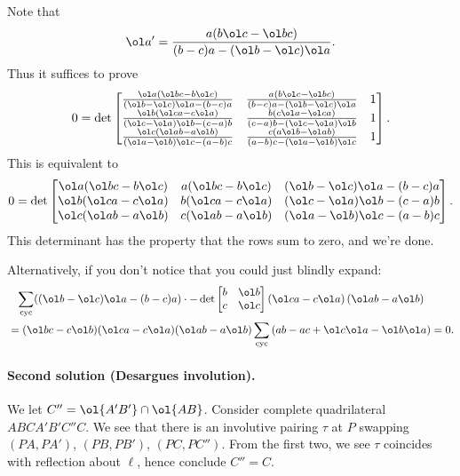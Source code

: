 \documentclass[11pt]{scrartcl}
\begin{document}
Note that
\[ \ol a' = \frac{a (b \ol c - \ol b c)}{(b-c) a - (\ol b - \ol c)\ol a}. \]
Thus it suffices to prove
\[ 0 = \det
\begin{bmatrix}
  \frac{\ol a(\ol b c-b \ol c)}{(\ol b - \ol c)\ol a - (b-c) a} & \frac{a (b \ol c - \ol b c)}{(b-c) a - (\ol b - \ol c) \ol a} & 1 \\
  \frac{\ol b(\ol c a-c \ol a)}{(\ol c - \ol a)\ol b - (c-a) b} & \frac{b (c \ol a - \ol c a)}{(c-a) b - (\ol c - \ol a) \ol b} & 1 \\
  \frac{\ol c(\ol a b-a \ol b)}{(\ol a - \ol b)\ol c - (a-b) c} & \frac{c (a \ol b - \ol a b)}{(a-b) c - (\ol a - \ol b)\ol c} & 1
\end{bmatrix}.
\]
This is equivalent to
\[ 0 = \det
\begin{bmatrix}
  \ol a(\ol b c -b \ol c) & a (\ol b c - b \ol c) & (\ol b - \ol c) \ol a - (b-c) a \\
  \ol b(\ol c a -c \ol a) & b (\ol c a - c \ol a) & (\ol c - \ol a) \ol b - (c-a) b \\
  \ol c(\ol a b -a \ol b) & c (\ol a b - a \ol b) & (\ol a - \ol b) \ol c - (a-b) c \\
\end{bmatrix}. \]
This determinant has the property that the rows sum to zero, and we're done.
\begin{remark*}
  Alternatively, if you don't notice that you could just blindly expand:
  \begin{align*}
    &\phantom{=} \sum_{\text{cyc}} ((\ol b - \ol c) \ol a - (b-c) a) \cdot
    - \det
    \begin{bmatrix}
      b & \ol b \\
      c & \ol c
    \end{bmatrix}
    \left( \ol c a - c \ol a \right)\left( \ol a b - a \ol b \right) \\
    &= (\ol b c - c \ol b)(\ol c a - c \ol a)(\ol a b - a \ol b)
    \sum_{\text{cyc}} \left( ab - ac + \ol c \ol a - \ol b \ol a \right) = 0.
  \end{align*}
\end{remark*}

\paragraph{Second solution (Desargues involution).}
We let $C'' = \ol{A'B'} \cap \ol{AB}$.
Consider complete quadrilateral $ABCA'B'C''C$.
We see that there is an involutive pairing $\tau$ at $P$
swapping $(PA,PA')$, $(PB,PB')$, $(PC,PC'')$.
From the first two, we see $\tau$ coincides with reflection
about $\ell$, hence conclude $C'' = C$.
\end{document}
